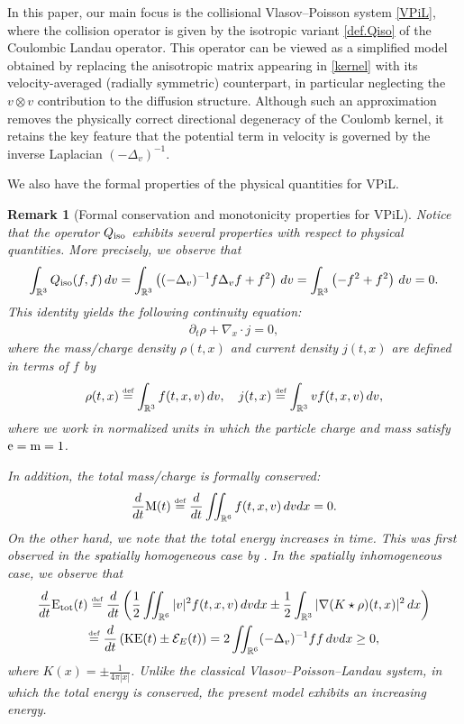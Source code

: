 \documentclass[reqno,11pt,final]{amsart}
\theoremstyle{plain}
\newtheorem{remark}[theorem]{Remark}
\numberwithin{equation}{section}
\numberwithin{theorem}{section}
\newcommand{\eqdef }{\overset{\mbox{\tiny{def}}}{=}}
\begin{document}
In this paper, our main focus is the collisional Vlasov--Poisson system
\eqref{VPiL}, where the collision operator is given by the isotropic variant
\eqref{def.Qiso} of the Coulombic Landau operator. This operator can be viewed
as a simplified model obtained by replacing the anisotropic matrix appearing in
\eqref{kernel} with its velocity-averaged (radially symmetric) counterpart, in
particular neglecting the $v\otimes v$ contribution to the diffusion
structure. Although such an approximation removes the physically correct
directional degeneracy of the Coulomb kernel, it retains the key feature that
the potential term in velocity is governed by the inverse Laplacian
$(-\Delta_v)^{-1}$.

We also have the formal properties of the physical quantities for VPiL.
\begin{remark}[Formal conservation and monotonicity properties for VPiL]
    \label{formal conservation laws}Notice that the operator $Q_\textup{iso}$ exhibits several properties with respect to physical quantities. More precisely, we observe that
\begin{align*}
\int_{\mathbb{R}^3} Q_\textup{iso}(f,f)\,dv = \int_{\mathbb{R}^3} \left((-\Delta_v)^{-1}f\Delta_vf + f^2\right)\,dv = \int_{\mathbb{R}^3} \left(-f^2 + f^2\right) \,dv = 0.
\end{align*}This identity yields the following continuity equation:
\begin{align*}
\partial_t\rho + \nabla_x\cdot j = 0,
\end{align*}where the mass/charge density $\rho(t,x)$ and current density $j(t,x)$ are defined in terms of $f$ by
\begin{align*}
\rho(t,x) \eqdef \int_{\mathbb{R}^3} f(t,x,v)\,dv, \quad  j(t,x) \eqdef \int_{\mathbb{R}^3} vf(t,x,v)\,dv,
\end{align*}where we work in normalized units in which the particle charge and mass satisfy $\textup{e}=\textup{m}=1$.


In addition, the total mass/charge is formally conserved:
\begin{align*}
\frac{d}{dt}\textup{M}(t) \eqdef \frac{d}{dt}\iint_{\mathbb{R}^6} f(t,x,v)\,dvdx = 0.
\end{align*}
On the other hand, we note that the total energy increases in time. This was first observed in the spatially homogeneous case by \cite{iL_Gualdani_2021}. In the spatially inhomogeneous case, we observe that 
\begin{equation}
\begin{gathered}\label{iL energy cons}
    \frac{d}{dt}\textup{E}_{\textup{tot}}(t) \eqdef \frac{d}{dt}\left(\frac{1}{2} \iint_{\mathbb{R}^6} |v|^2f(t,x,v)\,dvdx \pm \frac{1}{2}\int_{\mathbb{R}^3} |\nabla(K\star \rho)(t,x)|^2\,dx\right)\\
    \eqdef \frac{d}{dt}\left(\textup{KE}(t) \pm \mathcal{E}_E(t)\right) =2\iint_{\mathbb{R}^6} (-\Delta_v)^{-1}f f\,dvdx\ge0,
    \end{gathered}
\end{equation}where $K(x) = \pm\frac{1}{4\pi|x|}$. Unlike the classical Vlasov–Poisson–Landau system, in which the total energy is conserved, the present model exhibits an increasing energy. 


\end{remark}
\end{document}
